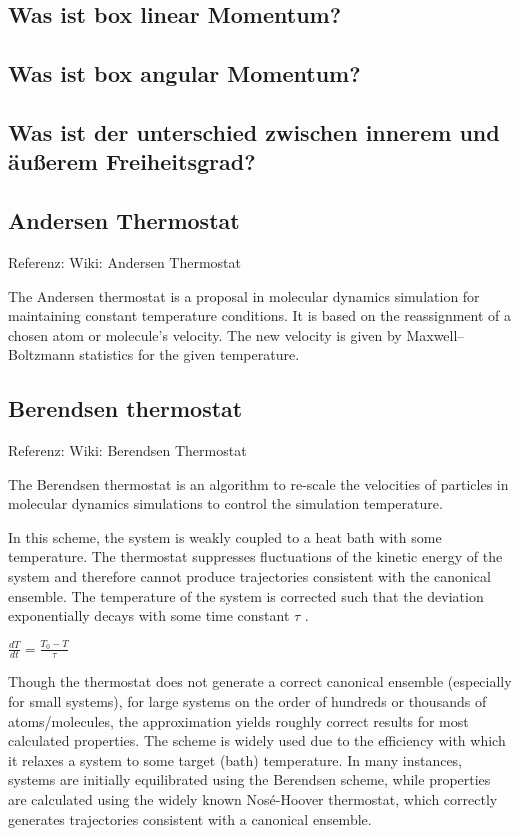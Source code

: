 \documentclass[]{article}
\begin{document}
\subsection*{Was ist box linear Momentum?}

\subsection*{Was ist box angular Momentum?}

\subsection{Was ist der unterschied zwischen innerem und äußerem Freiheitsgrad?}

\subsection{Andersen Thermostat}
Referenz: Wiki: Andersen Thermostat

The Andersen thermostat is a proposal in molecular dynamics simulation for maintaining constant temperature conditions. It is based on the reassignment of a chosen atom or molecule's velocity. The new velocity is given by Maxwell–Boltzmann statistics for the given temperature.

\subsection{Berendsen thermostat}
Referenz: Wiki: Berendsen Thermostat

The Berendsen thermostat is an algorithm to re-scale the velocities of particles in molecular dynamics simulations to control the simulation temperature.

In this scheme, the system is weakly coupled to a heat bath with some temperature. The thermostat suppresses fluctuations of the kinetic energy of the system and therefore cannot produce trajectories consistent with the canonical ensemble. The temperature of the system is corrected such that the deviation exponentially decays with some time constant $\tau$ .

$\frac{dT}{dt}=\frac{T_0-T}{\tau}$

Though the thermostat does not generate a correct canonical ensemble (especially for small systems), for large systems on the order of hundreds or thousands of atoms/molecules, the approximation yields roughly correct results for most calculated properties. The scheme is widely used due to the efficiency with which it relaxes a system to some target (bath) temperature. In many instances, systems are initially equilibrated using the Berendsen scheme, while properties are calculated using the widely known Nosé-Hoover thermostat, which correctly generates trajectories consistent with a canonical ensemble.
\end{document}
